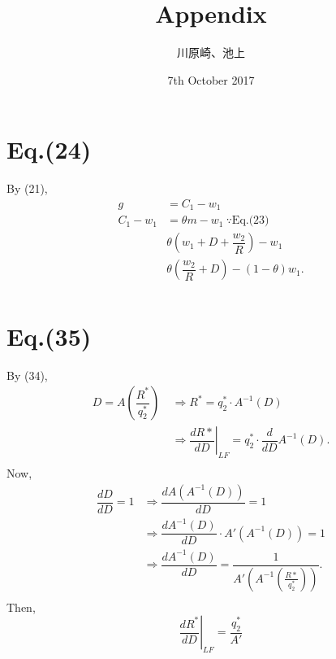 \documentclass[a4paper,11pt]{article}
\title{Appendix}
\author{川原崎、池上}
\date{7th October 2017}
\begin{document}
\maketitle

\section{Eq.(24)}
	By (21),
	\begin{align*}
		 g & = C_1 - w_1 \\
		C_1 - w_1 & = \theta m - w_1 \: \because \text{Eq.(23)} \\
			& \theta \left(w_1 + D + \dfrac{w_2}{R} \right) - w_1 \\
			& \theta \left(\dfrac{w_2}{R} + D\right) - (1-\theta) w_1. \\
	\end{align*}

\section{Eq.(35)}
	By (34),
	\begin{align*}
		D = A \left( \dfrac{R^*}{q_2^*}\right) \: & \Rightarrow R^* = q_2^* \cdot A^{-1}(D) \\
			& \Rightarrow  \left. \dfrac{dR*}{dD} \right|_{LF} = q_2^* \cdot \dfrac{d}{dD} A^{-1}(D). \\
	\end{align*}
	Now,
	\begin{align*}
			\dfrac{dD}{dD} = 1& \Rightarrow  \dfrac{dA(A^{-1}(D))}{dD} = 1 \\
			& \Rightarrow \dfrac{dA^{-1}(D)}{dD} \cdot A'(A^{-1}(D)) = 1 \\
			& \Rightarrow \dfrac{dA^{-1}(D)}{dD}= \dfrac{1}{A'\left(A^{-1}\left(\frac{R*}{q_2^*}\right)\right)}. \\
	\end{align*}
	Then,
	\begin{equation*}
		\left. \dfrac{dR^*}{dD} \right|_{LF} = \dfrac{q_2^*}{A'}
	\end{equation*}
\end{document}
